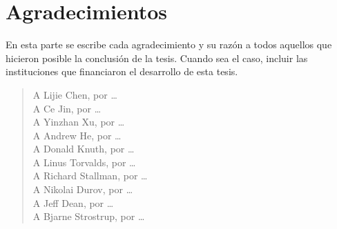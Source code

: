 \chapter*{Agradecimientos}
\thispagestyle{empty}

\vspace{-0.5cm}

En esta parte se escribe cada agradecimiento y su raz\'on a todos aquellos que
hicieron posible la conclusi\'on de la tesis.
Cuando sea el caso, incluir las instituciones que financiaron el desarrollo
de esta tesis.

\begin{verse}
  A Lijie Chen, por \dots \\
  A Ce Jin, por \dots \\
  A Yinzhan Xu, por \dots \\
  A Andrew He, por \dots \\
  A Donald Knuth, por \dots \\
  A Linus Torvalds, por \dots \\
  A Richard Stallman, por \dots \\
  A Nikolai Durov, por \dots \\
  A Jeff Dean, por \dots \\
  A Bjarne Strostrup, por \dots \\
\end{verse}
